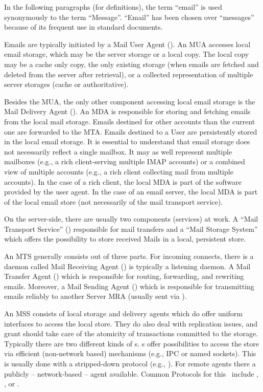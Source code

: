 In the following paragraphs (for definitions), the term ``email'' is used synonymously to the term ``Message''.  ``Email'' has been chosen over ``messages'' because of its frequent use in standard documents.

Emails are typically initiated by a Mail User Agent (). An MUA accesses local email storage, which may be the server storage or a local copy. The local copy may be a cache only copy, the only existing storage (when emails are fetched and deleted from the server after retrieval), or a collected representation of multiple server storages (cache or authoritative).

Besides the MUA, the only other component accessing local email storage is the Mail Delivery Agent (). An MDA is responsible for storing and fetching emails from the local mail storage. Emails destined for other accounts than the current one are forwarded to the MTA. Emails destined to a User are persistently stored in the local email storage. It is essential to understand that email storage does not necessarily reflect a single mailbox. It may as well represent multiple mailboxes (e.g., a rich client-serving multiple IMAP accounts) or a combined view of multiple accounts (e.g., a rich client collecting mail from multiple  accounts). In the case of a rich client, the local MDA is part of the software provided by the user agent. In the case of an email server, the local MDA is part of the local email store (not necessarily of the mail transport service).

On the server-side, there are usually two components (services) at work. A ``Mail Transport Service'' () responsible for mail transfers and a ``Mail Storage System'' which offers the possibility to store received Mails in a local, persistent store.\par

An MTS generally consists out of three parts. For incoming connects, there is a daemon called Mail Receiving Agent () is typically a  listening daemon. A Mail Transfer Agent () which is responsible for routing, forwarding, and rewriting emails. Moreover, a Mail Sending Agent () which is responsible for transmitting emails reliably to another Server MRA (usually sent via ).\par

An MSS consists of local storage and delivery agents which do offer uniform interfaces to access the local store. They do also deal with replication issues, and grant should take care of the atomicity of transactions committed to the storage. Typically there are two different kinds of s. s offer possibilities to access the store via efficient (non-network based) mechanisms (e.g., IPC or named sockets). This is usually done with a stripped-down protocol (e.g., ). For remote agents there a publicly -- network-based -- agent available. Common Protocols for this \ include , , or .\par

